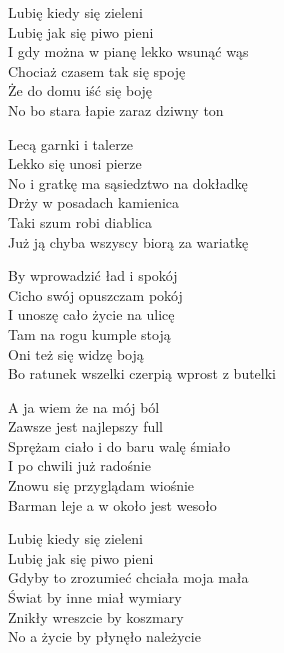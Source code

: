 \begin{text}
    Lubię kiedy się zieleni\\
    Lubię jak się piwo pieni\\
    I gdy można w pianę lekko wsunąć wąs\\
    Chociaż czasem tak się spoję\\
    Że do domu iść się boję\\
    No bo stara łapie zaraz dziwny ton

    Lecą garnki i talerze\\
    Lekko się unosi pierze\\
    No i gratkę ma sąsiedztwo na dokładkę\\
    Drży w posadach kamienica\\
    Taki szum robi diablica\\
    Już ją chyba wszyscy biorą za wariatkę

    By wprowadzić ład i spokój\\
    Cicho swój opuszczam pokój\\
    I unoszę cało życie na ulicę\\
    Tam na rogu kumple stoją\\
    Oni też się widzę boją\\
    Bo ratunek wszelki czerpią wprost z butelki

    A ja wiem że na mój ból\\
    Zawsze jest najlepszy full\\
    Sprężam ciało i do baru walę śmiało\\
    I po chwili już radośnie\\
    Znowu się przyglądam wiośnie\\
    Barman leje a w około jest wesoło

    Lubię kiedy się zieleni\\
    Lubię jak się piwo pieni\\
    Gdyby to zrozumieć chciała moja mała\\
    Świat by inne miał wymiary\\
    Znikły wreszcie by koszmary\\
    No a życie by płynęło należycie

\end{text}
